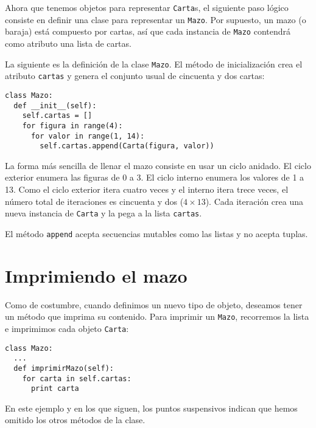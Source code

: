 Ahora que tenemos objetos para representar  \texttt{Carta}s, el siguiente paso lógico consiste en definir una clase para representar un \texttt{Mazo}. Por supuesto, un mazo (o baraja) está compuesto por cartas, así que cada instancia
de \texttt{Mazo} contendrá como atributo una lista de cartas.


La siguiente es la definición de la clase  \texttt{Mazo}. El método de inicialización crea el atributo  \texttt{cartas} y genera el conjunto usual de cincuenta y dos cartas:


\beforeverb
\begin{verbatim}
class Mazo:
  def __init__(self):
    self.cartas = []
    for figura in range(4):
      for valor in range(1, 14):
        self.cartas.append(Carta(figura, valor))
\end{verbatim}
\afterverb
%
La forma más sencilla de llenar el mazo consiste en usar un ciclo anidado. El ciclo exterior enumera 
las figuras de 0 a 3. El ciclo interno enumera los valores de 1 a 13. Como el ciclo exterior itera 
cuatro veces y el interno itera trece veces, el número total de iteraciones es cincuenta y dos ($4 \times 13$). 
Cada iteración crea una nueva instancia de \texttt{Carta} y la pega a la lista \texttt{cartas}.

El método \texttt{append} acepta secuencias mutables como las listas y no acepta tuplas.



\section{Imprimiendo el mazo}
\label{printdeck}

Como de costumbre, cuando definimos un nuevo tipo de objeto, deseamos tener un método que imprima su contenido. Para imprimir un \texttt{Mazo}, recorremos la lista e imprimimos cada objeto \texttt{Carta}:

\beforeverb
\begin{verbatim}
class Mazo:
  ...
  def imprimirMazo(self):
    for carta in self.cartas:
      print carta
\end{verbatim}
\afterverb
%
En este ejemplo y en los que siguen, los puntos suspensivos indican que hemos omitido los otros métodos de la clase.

